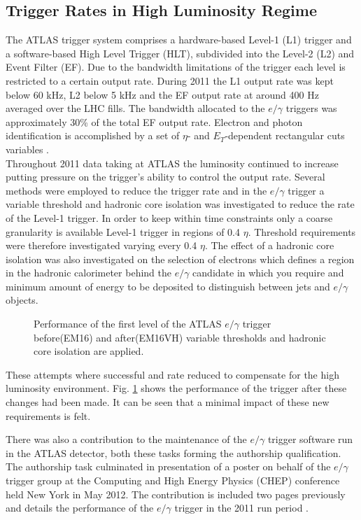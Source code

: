 \subsection{Trigger Rates in High Luminosity Regime}
The ATLAS trigger system comprises a
hardware-based Level-1 (L1) trigger and a software-based
High Level Trigger (HLT), subdivided into the Level-2
(L2) and Event Filter (EF). Due to the bandwidth
limitations of the trigger each level is restricted to a
certain output rate. During 2011 the L1 output rate was
kept below 60 kHz, L2 below 5 kHz and the EF output
rate at around 400 Hz averaged over the LHC fills. The
bandwidth allocated to the $e/\gamma$ triggers was
approximately 30\% of the total EF output rate.
Electron and photon identification is accomplished by a
set of $\eta$- and $E_{T}$-dependent rectangular cuts variables
\cite{trig1, trig2}.\\
Throughout 2011 data taking at ATLAS the luminosity continued to increase putting pressure on the trigger's ability to control the output rate. Several methods were employed to reduce the trigger rate and in the $e/\gamma$ trigger a variable threshold and hadronic core isolation was investigated to reduce the rate of the Level-1 trigger. In order to keep within time constraints only a coarse granularity is available Level-1 trigger in regions of 0.4 $\eta$. Threshold requirements were therefore investigated varying every 0.4 $\eta$. The effect of a hadronic core isolation was also investigated on the selection of electrons which defines a region in the hadronic calorimeter behind the $e/\gamma$ candidate in which you require and minimum amount of energy to be deposited to distinguish between jets and $e/\gamma$ objects. 


\begin{figure}[h!]
\centering

\caption{Performance of the first level of the ATLAS $e/\gamma$ trigger before(EM16) and after(EM16VH) variable thresholds and hadronic core isolation are applied.}
\label{fig:L1}
\end{figure}

These attempts where successful and rate reduced to compensate for the high luminosity environment. Fig. \ref{fig:L1} shows the performance of the trigger after these changes had been made. It can be seen that a minimal impact of these new requirements is felt.


There was also a contribution to the maintenance of the $e/\gamma$ trigger software run in the ATLAS detector, both these tasks forming the authorship qualification. The authorship task culminated in presentation of a poster on behalf of the $e/\gamma$ trigger group at the Computing and High Energy Physics (CHEP) conference held New York in May 2012. The contribution is included two pages previously and details the performance of the $e/\gamma$ trigger in the 2011 run period \cite{poster}.

